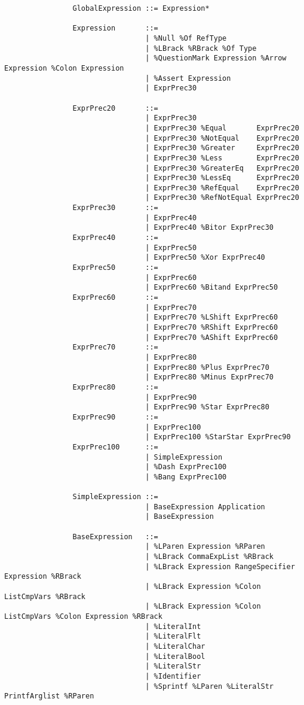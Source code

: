 \documentclass{article}
\begin{document}
\begin{verbatim}
				GlobalExpression ::= Expression*
			
				Expression       ::=
				                 | %Null %Of RefType
				                 | %LBrack %RBrack %Of Type
				                 | %QuestionMark Expression %Arrow Expression %Colon Expression
 				                 | %Assert Expression
				                 | ExprPrec30
				
				ExprPrec20       ::= 
				                 | ExprPrec30
				                 | ExprPrec30 %Equal       ExprPrec20
				                 | ExprPrec30 %NotEqual    ExprPrec20
				                 | ExprPrec30 %Greater     ExprPrec20
				                 | ExprPrec30 %Less        ExprPrec20
				                 | ExprPrec30 %GreaterEq   ExprPrec20
				                 | ExprPrec30 %LessEq      ExprPrec20
				                 | ExprPrec30 %RefEqual    ExprPrec20
				                 | ExprPrec30 %RefNotEqual ExprPrec20
				ExprPrec30       ::=
				                 | ExprPrec40
				                 | ExprPrec40 %Bitor ExprPrec30
				ExprPrec40       ::=
				                 | ExprPrec50
				                 | ExprPrec50 %Xor ExprPrec40
				ExprPrec50       ::=
				                 | ExprPrec60
				                 | ExprPrec60 %Bitand ExprPrec50
				ExprPrec60       ::=
				                 | ExprPrec70
				                 | ExprPrec70 %LShift ExprPrec60
				                 | ExprPrec70 %RShift ExprPrec60
				                 | ExprPrec70 %AShift ExprPrec60
				ExprPrec70       ::=
				                 | ExprPrec80
				                 | ExprPrec80 %Plus ExprPrec70
				                 | ExprPrec80 %Minus ExprPrec70
				ExprPrec80       ::=
				                 | ExprPrec90
				                 | ExprPrec90 %Star ExprPrec80
				ExprPrec90       ::=
				                 | ExprPrec100
				                 | ExprPrec100 %StarStar ExprPrec90
				ExprPrec100      ::=
				                 | SimpleExpression
				                 | %Dash ExprPrec100
				                 | %Bang ExprPrec100
				                 
				SimpleExpression ::=
				                 | BaseExpression Application
				                 | BaseExpression
				
				BaseExpression   ::=
				                 | %LParen Expression %RParen
				                 | %LBrack CommaExpList %RBrack
				                 | %LBrack Expression RangeSpecifier Expression %RBrack
				                 | %LBrack Expression %Colon ListCmpVars %RBrack
				                 | %LBrack Expression %Colon ListCmpVars %Colon Expression %RBrack
				                 | %LiteralInt
				                 | %LiteralFlt
				                 | %LiteralChar
				                 | %LiteralBool
				                 | %LiteralStr
				                 | %Identifier
				                 | %Sprintf %LParen %LiteralStr PrintfArglist %RParen
				                 

\end{verbatim}
\end{document}
